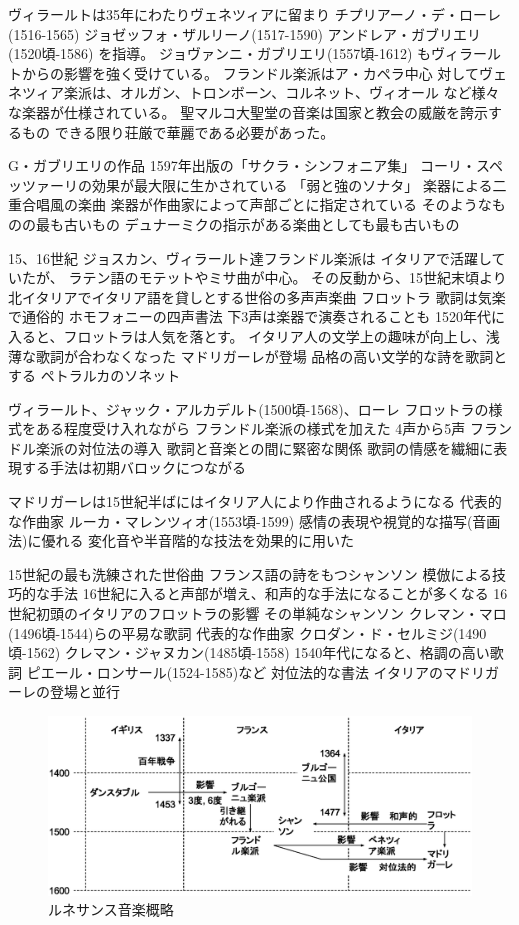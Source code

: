 \documentclass[a4j]{jarticle}
\begin{document}
ヴィラールトは35年にわたりヴェネツィアに留まり
チプリアーノ・デ・ローレ(1516-1565)
ジョゼッフォ・ザルリーノ(1517-1590)
アンドレア・ガブリエリ(1520頃-1586)
を指導。
ジョヴァンニ・ガブリエリ(1557頃-1612)
もヴィラールトからの影響を強く受けている。
フランドル楽派はア・カペラ中心
対してヴェネツィア楽派は、オルガン、トロンボーン、コルネット、ヴィオール
など様々な楽器が仕様されている。
聖マルコ大聖堂の音楽は国家と教会の威厳を誇示するもの
できる限り荘厳で華麗である必要があった。

G・ガブリエリの作品
1597年出版の「サクラ・シンフォニア集」
コーリ・スペッツァーリの効果が最大限に生かされている
「弱と強のソナタ」
楽器による二重合唱風の楽曲
楽器が作曲家によって声部ごとに指定されている
そのようなものの最も古いもの
デュナーミクの指示がある楽曲としても最も古いもの

15、16世紀
ジョスカン、ヴィラールト達フランドル楽派は
イタリアで活躍していたが、
ラテン語のモテットやミサ曲が中心。
その反動から、15世紀末頃より
北イタリアでイタリア語を貸しとする世俗の多声声楽曲
フロットラ
歌詞は気楽で通俗的
ホモフォニーの四声書法
下3声は楽器で演奏されることも
1520年代に入ると、フロットラは人気を落とす。
イタリア人の文学上の趣味が向上し、浅薄な歌詞が合わなくなった
マドリガーレが登場
品格の高い文学的な詩を歌詞とする
ペトラルカのソネット

ヴィラールト、ジャック・アルカデルト(1500頃-1568)、ローレ
フロットラの様式をある程度受け入れながら
フランドル楽派の様式を加えた
4声から5声
フランドル楽派の対位法の導入
歌詞と音楽との間に緊密な関係
歌詞の情感を繊細に表現する手法は初期バロックにつながる

マドリガーレは15世紀半ばにはイタリア人により作曲されるようになる
代表的な作曲家
ルーカ・マレンツィオ(1553頃-1599)
感情の表現や視覚的な描写(音画法)に優れる
変化音や半音階的な技法を効果的に用いた

15世紀の最も洗練された世俗曲
フランス語の詩をもつシャンソン
模倣による技巧的な手法
16世紀に入ると声部が増え、和声的な手法になることが多くなる
16世紀初頭のイタリアのフロットラの影響
その単純なシャンソン
クレマン・マロ(1496頃-1544)らの平易な歌詞
代表的な作曲家
クロダン・ド・セルミジ(1490頃-1562)
クレマン・ジャヌカン(1485頃-1558)
1540年代になると、格調の高い歌詞
ピエール・ロンサール(1524-1585)など
対位法的な書法
イタリアのマドリガーレの登場と並行

\begin{figure}[tb]
 \begin{center}
  \includegraphics[width=\hsize]{fig/renaissance_summary.eps}
  \caption{ルネサンス音楽概略}
  \label{fig:renaissance_summary}
 \end{center}
\end{figure}
\end{document}
